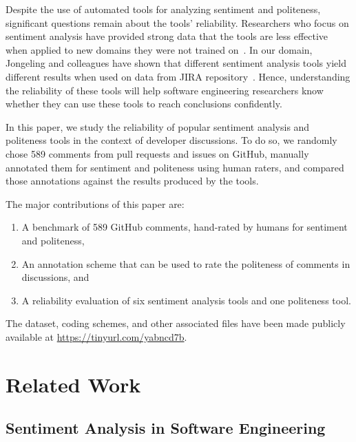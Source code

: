 Despite the use of automated tools for analyzing sentiment and 
politeness, significant questions remain about the tools' reliability.
Researchers who focus on sentiment analysis have provided strong data
that the tools are less effective when applied to new domains they 
were not trained on~\cite{novielli2015challenges,gamon2005pulse}. 
In our domain, Jongeling and colleagues have 
shown that different sentiment analysis tools yield different 
results when used on data from JIRA repository~\cite{jongeling2017negative}. 
Hence, understanding the reliability of these tools will help 
software engineering researchers know whether they can use these
tools to reach conclusions confidently.

In this paper, we study the reliability of popular sentiment analysis 
and politeness tools in the context of developer discussions.
To do so, we randomly chose 589 comments from pull requests and issues on GitHub,
manually annotated them for sentiment and politeness using human raters,
and compared those annotations against the results produced by the tools. 

The major contributions of this paper are:
\begin{enumerate}
    \item A benchmark of 589 GitHub comments, 
    hand-rated by humans for sentiment and politeness, 
    \item An annotation scheme that can be used to rate 
    the politeness of comments in discussions, and
    \item A reliability evaluation of six sentiment analysis 
    tools and one politeness tool.
\end{enumerate}

The dataset, coding schemes, and other associated files have been made publicly available at \href{https://tinyurl.com/yabncd7b}{https://tinyurl.com/yabncd7b}.


\section{Related Work}\label{relwork}
\subsection{Sentiment Analysis in Software Engineering}\label{rwsent}

